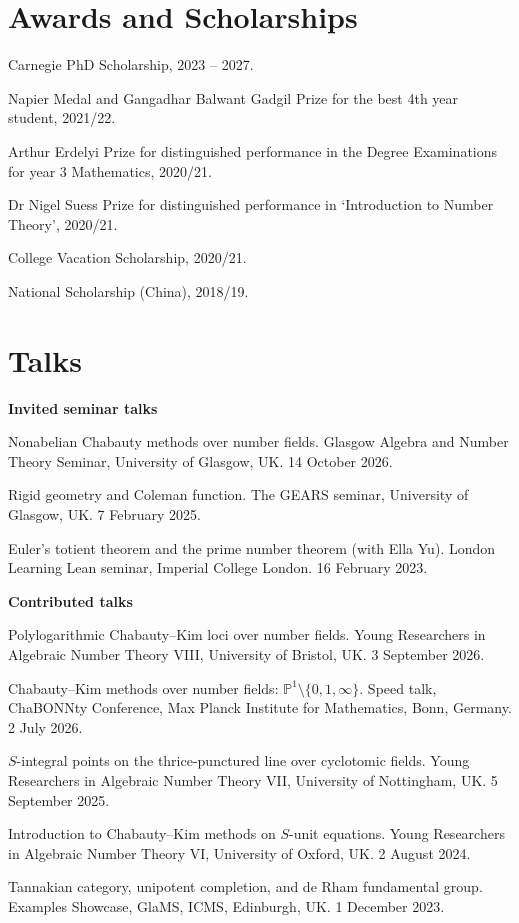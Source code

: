 \documentclass[11pt,a4paper]{article}
\begin{document}
\section*{Awards and Scholarships}
\begin{cvlist}
  \item Carnegie PhD Scholarship, 2023 -- 2027.
  \item Napier Medal and Gangadhar Balwant Gadgil Prize for the best 4th year student, 2021/22.
  \item Arthur Erdelyi Prize for distinguished performance in the Degree Examinations for year 3 Mathematics, 2020/21.
  \item Dr Nigel Suess Prize for distinguished performance in `Introduction to Number Theory', 2020/21.
  \item College Vacation Scholarship, 2020/21.
  \item National Scholarship (China), 2018/19.
\end{cvlist}

\section*{Talks}
\textbf{Invited seminar talks}
\begin{cvlist}
  \item Nonabelian Chabauty methods over number fields.
        Glasgow Algebra and Number Theory Seminar, University of Glasgow, UK. 14 October 2026.
  \item Rigid geometry and Coleman function.
        The GEARS seminar, University of Glasgow, UK. 7 February 2025.
  \item Euler's totient theorem and the prime number theorem (with Ella Yu).
        London Learning Lean seminar, Imperial College London. 16 February 2023.
\end{cvlist}

\textbf{Contributed talks}
\begin{cvlist}
  \item Polylogarithmic Chabauty--Kim loci over number fields.
        Young Researchers in Algebraic Number Theory VIII, University of Bristol, UK. 3 September 2026.
  \item Chabauty--Kim methods over number fields: $\mathbb{P}^1\setminus\{0,1,\infty\}$.
        Speed talk, ChaBONNty Conference, Max Planck Institute for Mathematics, Bonn, Germany. 2 July 2026.
  \item \(S\)-integral points on the thrice-punctured line over cyclotomic fields.
        Young Researchers in Algebraic Number Theory VII, University of Nottingham, UK. 5 September 2025.
  \item Introduction to Chabauty--Kim methods on $S$-unit equations.
        Young Researchers in Algebraic Number Theory VI, University of Oxford, UK. 2 August 2024.
  \item Tannakian category, unipotent completion, and de Rham fundamental group.
        Examples Showcase, GlaMS, ICMS, Edinburgh, UK. 1 December 2023.
\end{cvlist}
\end{document}
